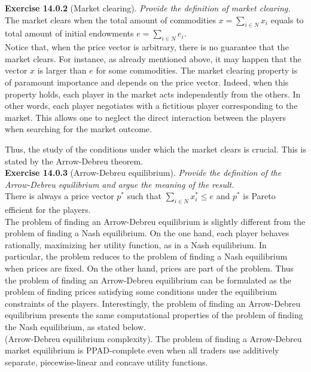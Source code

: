 \textbf{Exercise 14.0.2} (Market clearing). \textit{Provide the definition of market clearing.}\\

The market clears when the total amount of commodities $x=\sum_{i \in N} x_{i}$ equals to total amount of initial endowments $e=\sum_{i \in N} e_{i}$.\\
Notice that, when the price vector is arbitrary, there is no guarantee that the market clears. For instance, as already mentioned above, it may happen that the vector $x$ is larger than $e$ for some commodities. The market clearing property is of paramount importance and depends on the price vector. Indeed, when this property holds, each player in the market acts independently from the others. In other words, each player negotiates with a fictitious player corresponding to the market. This allows one to neglect the direct interaction between the players when searching for the market outcome.

Thus, the study of the conditions under which the market clears is crucial. This is stated by the Arrow-Debreu theorem.\\

\textbf{Exercise 14.0.3} (Arrow-Debreu equilibrium). \textit{Provide the definition of the Arrow-Debreu equilibrium and argue the meaning of the result.}\\

There is always a price vector $p^{*}$ such that $\sum_{i \in N} x_{i}^{*} \leqslant e$ and $p^{*}$ is Pareto efficient for the players.\\
The problem of finding an Arrow-Debreu equilibrium is slightly different from the problem of finding a Nash equilibrium. On the one hand, each player behaves rationally, maximizing her utility function, as in a Nash equilibrium. In particular, the problem reduces to the problem of finding a Nash equilibrium when prices are fixed. On the other hand, prices are part of the problem. Thus the problem of finding an Arrow-Debreu equilibrium can be formulated as the problem of finding prices satisfying some conditions under the equilibrium constraints of the players. Interestingly, the problem of finding an Arrow-Debreu equilibrium presents the same computational properties of the problem of finding the Nash equilibrium, as stated below.\\
(Arrow-Debreu equilibrium complexity). The problem of finding a Arrow-Debreu market equilibrium is \textsf{PPAD}-complete even when all traders use additively separate, piecewise-linear and concave utility functions.

